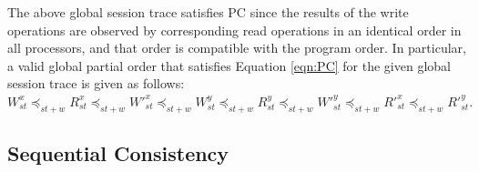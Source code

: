 \documentclass[journal, compsoc]{IEEEtran}
\begin{document}
	
	The above global session trace satisfies PC %
	since the results of the write operations are observed by corresponding read operations in an identical order in all processors, and that order is compatible with the program order. In particular, a valid global partial order that satisfies Equation \ref{eqn:PC} for the given global session trace is given as follows: 
	$W^x_{\mathit{st}}  \preccurlyeq_{\mathit{st}+w} R^x_{\mathit{st}} \preccurlyeq_{\mathit{st}+w} W'^x_{\mathit{st}} \preccurlyeq_{\mathit{st}+w} W^y_{\mathit{st}} \preccurlyeq_{\mathit{st}+w}   R^y_{\mathit{st}} \preccurlyeq_{\mathit{st}+w} W'^y_{\mathit{st}}   \preccurlyeq_{\mathit{st}+w} R'^x_{\mathit{st}} \preccurlyeq_{\mathit{st}+w} R'^y_{\mathit{st}} .$ 
	
	
	\subsection{Sequential Consistency}
	
\end{document}
